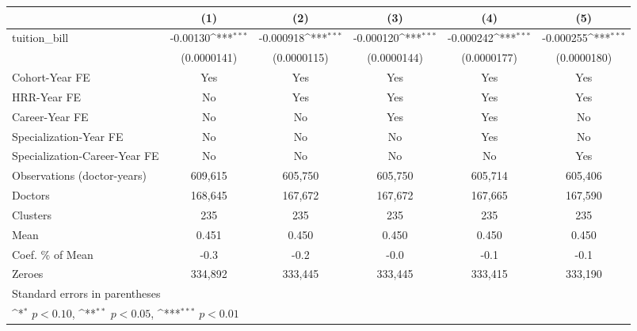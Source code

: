 {
\def\sym#1{\ifmmode^{#1}\else\(^{#1}\)\fi}
\begin{tabular}{l*{5}{c}}
\hline\hline
                    &\multicolumn{1}{c}{(1)}         &\multicolumn{1}{c}{(2)}         &\multicolumn{1}{c}{(3)}         &\multicolumn{1}{c}{(4)}         &\multicolumn{1}{c}{(5)}         \\
\hline
tuition\_bill        &    -0.00130\sym{***}&   -0.000918\sym{***}&   -0.000120\sym{***}&   -0.000242\sym{***}&   -0.000255\sym{***}\\
                    & (0.0000141)         & (0.0000115)         & (0.0000144)         & (0.0000177)         & (0.0000180)         \\
[1em]
Cohort-Year FE      &         Yes         &         Yes         &         Yes         &         Yes         &         Yes         \\
[1em]
HRR-Year FE         &          No         &         Yes         &         Yes         &         Yes         &         Yes         \\
[1em]
Career-Year FE      &          No         &          No         &         Yes         &         Yes         &          No         \\
[1em]
Specialization-Year FE&          No         &          No         &          No         &         Yes         &          No         \\
[1em]
Specialization-Career-Year FE&          No         &          No         &          No         &          No         &         Yes         \\
\hline
Observations (doctor-years)&     609,615         &     605,750         &     605,750         &     605,714         &     605,406         \\
Doctors             &     168,645         &     167,672         &     167,672         &     167,665         &     167,590         \\
Clusters            &         235         &         235         &         235         &         235         &         235         \\
Mean                &       0.451         &       0.450         &       0.450         &       0.450         &       0.450         \\
Coef. \% of Mean    &        -0.3         &        -0.2         &        -0.0         &        -0.1         &        -0.1         \\
Zeroes              &     334,892         &     333,445         &     333,445         &     333,415         &     333,190         \\
\hline\hline
\multicolumn{6}{l}{\footnotesize Standard errors in parentheses}\\
\multicolumn{6}{l}{\footnotesize \sym{*} \(p<0.10\), \sym{**} \(p<0.05\), \sym{***} \(p<0.01\)}\\
\end{tabular}
}
